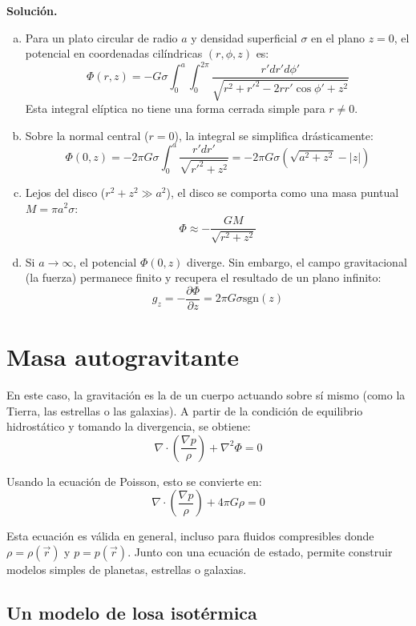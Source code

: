 \textbf{Solución.}
\begin{enumerate}[a)]
    \item Para un plato circular de radio $a$ y densidad superficial $\sigma$ en el plano $z=0$, el potencial en coordenadas cilíndricas $(r, \phi, z)$ es:
    $$ \Phi(r, z) = -G\sigma \int_0^a \int_0^{2\pi} \frac{r' dr' d\phi'}{\sqrt{r^2 + r'^2 - 2rr'\cos\phi' + z^2}} $$
    Esta integral elíptica no tiene una forma cerrada simple para $r \neq 0$.

    \item Sobre la normal central ($r=0$), la integral se simplifica drásticamente:
    $$ \Phi(0, z) = -2\pi G \sigma \int_0^a \frac{r' dr'}{\sqrt{r'^2 + z^2}} = -2\pi G \sigma \left( \sqrt{a^2 + z^2} - |z| \right) $$

    \item Lejos del disco ($r^2 + z^2 \gg a^2$), el disco se comporta como una masa puntual $M = \pi a^2 \sigma$:
    $$ \Phi \approx -\frac{GM}{\sqrt{r^2 + z^2}} $$

    \item Si $a \to \infty$, el potencial $\Phi(0, z)$ diverge. Sin embargo, el campo gravitacional (la fuerza) permanece finito y recupera el resultado de un plano infinito:
    $$ g_z = -\frac{\partial \Phi}{\partial z} = 2\pi G \sigma \text{sgn}(z) $$
\end{enumerate}

\section{Masa autogravitante}

En este caso, la gravitación es la de un cuerpo actuando sobre sí mismo (como la Tierra, las estrellas o las galaxias). A partir de la condición de equilibrio hidrostático y tomando la divergencia, se obtiene:
$$ \nabla \cdot \left( \frac{\nabla p}{\rho} \right) + \nabla^2 \Phi = 0 $$

Usando la ecuación de Poisson, esto se convierte en:
$$ \nabla \cdot \left( \frac{\nabla p}{\rho} \right) + 4\pi G \rho = 0 $$

Esta ecuación es válida en general, incluso para fluidos compresibles donde $\rho = \rho(\vec{r})$ y $p = p(\vec{r})$. Junto con una ecuación de estado, permite construir modelos simples de planetas, estrellas o galaxias.

\figuraCierreAutogravitante

\subsection{Un modelo de losa isotérmica}

